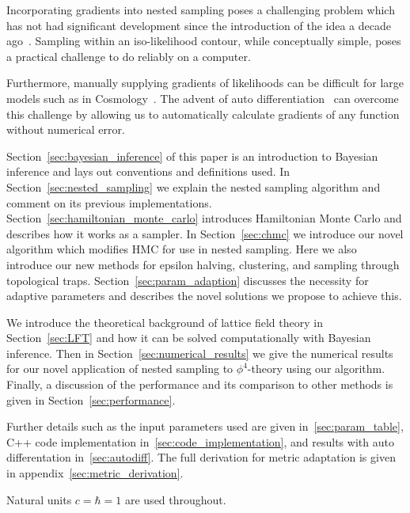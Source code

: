 \documentclass[11pt]{article}
\begin{document}
    Incorporating gradients into nested sampling poses a challenging problem which has not had significant development
    since the introduction of the idea a decade ago~\cite{Betancourt_NS_CHMC, GMC}.
    Sampling within an iso-likelihood contour, while conceptually simple, poses a practical challenge to do reliably on
    a computer.

    Furthermore, manually supplying gradients of likelihoods can be difficult for large models such as in
    Cosmology~\cite{plank2018, Handley_2015, mukherjee2006nested}.
    The advent of auto differentiation~\cite{NEURIPS2020_9332c513, 10.1145/3458817.3476165, 10.5555/3571885.3571964}
    can overcome this challenge by allowing us to automatically calculate gradients of any function without
    numerical error.

    Section~\ref{sec:bayesian_inference} of this paper is an introduction to Bayesian inference and lays out conventions
    and definitions used.
    In Section~\ref{sec:nested_sampling} we explain the nested sampling algorithm and comment on its
    previous implementations.
    Section~\ref{sec:hamiltonian_monte_carlo} introduces Hamiltonian Monte Carlo and describes how it works as a sampler.
    In Section~\ref{sec:chmc} we introduce our novel algorithm which modifies HMC for use in nested sampling.
    Here we also introduce our new methods for epsilon halving, clustering, and sampling through topological traps.
    Section~\ref{sec:param_adaption} discusses the necessity for adaptive parameters and describes
    the novel solutions we propose to achieve this.

    We introduce the theoretical background of lattice field theory in Section~\ref{sec:LFT} and how it can be
    solved computationally with Bayesian inference.
    Then in Section~\ref{sec:numerical_results} we give the numerical results for our novel application of nested
    sampling to $\phi^4$-theory using our algorithm.
    Finally, a discussion of the performance and its comparison to other methods is given in Section~\ref{sec:performance}.

    Further details such as the input parameters used are given in~\cref{sec:param_table},
    C++ code implementation in~\cref{sec:code_implementation}, and results with auto differentation in~\cref{sec:autodiff}.
    The full derivation for metric adaptation is given in appendix~\ref{sec:metric_derivation}.

    Natural units $c = \hbar = 1$ are used throughout.
\end{document}

